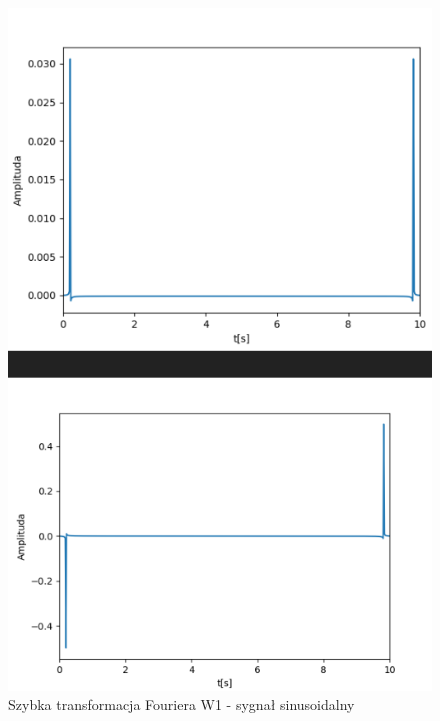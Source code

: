 \documentclass[12pt]{article}
\begin{document}
\begin{figure}[H]
\centering
\includegraphics[scale=0.6]{sinusFastW1.png}
\caption{Szybka transformacja Fouriera W1 - sygnał sinusoidalny}
\end{figure}
\end{document}
